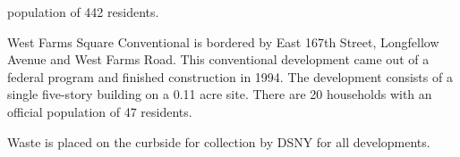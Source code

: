 population of 442 residents.\par \vspace{.7\baselineskip}West Farms Square Conventional is bordered by East 167th Street, Longfellow Avenue and West Farms Road. This conventional development came out of a federal program and finished construction in 1994. The development consists of a single five-story building on a 0.11 acre site. There are 20 households with an official population of 47 residents.\par \vspace{.7\baselineskip}Waste is placed on the curbside for collection by DSNY for all developments.